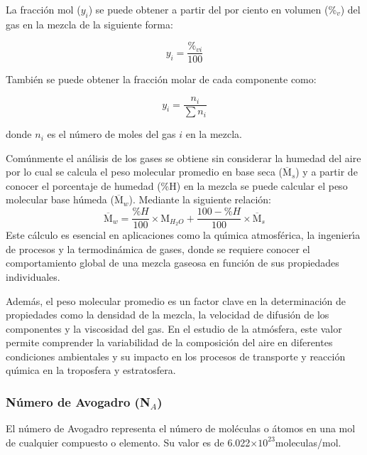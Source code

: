 La fracci\'on mol ($y_i$) se puede obtener a partir del por ciento en volumen (\%$_v$) del gas en la mezcla de la siguiente forma:

\begin{equation}
y_i = \frac{\%_{vi} }{100} 
\label{fraccion}
\end{equation}

Tambi\'en se puede obtener la fracci\'on molar de cada componente  como:

\begin{equation}
y_i = \frac{n_i}{\sum n_i}
\end{equation}

donde $n_i$ es el n\'umero de moles del gas $i$ en la mezcla.

Com\'unmente el an\'alisis de los gases se obtiene sin considerar la humedad del aire por lo cual se calcula el peso molecular promedio en base seca ($\overline{\textrm{M}}_s$) y a partir de conocer el porcentaje de humedad (\%H) en la mezcla se puede calcular el peso molecular base h\'umeda ($\overline{\textrm{M}}_w$). Mediante la siguiente relaci\'on:
\begin{equation}
\overline{\textrm{M}}_w= \frac{\%H}{100}\times \textrm{M}_{H_2O} +
\frac{100-\%H}{100} \times \overline{\textrm{M}}_s
\label{hum}
\end{equation}
Este c\'alculo es esencial en aplicaciones como la qu\'{\i}mica atmosf\'erica, la ingenier\'{\i}a de procesos y la termodin\'amica de gases, donde se requiere conocer el comportamiento global de una mezcla gaseosa en funci\'on de sus propiedades individuales. 

Adem\'as, el peso molecular promedio es un factor clave en la determinaci\'on de propiedades como la densidad de la mezcla, la velocidad de difusi\'on de los componentes y la viscosidad del gas. En el estudio de la atm\'osfera, este valor permite comprender la variabilidad de la composici\'on del aire en diferentes condiciones ambientales y su impacto en los procesos de transporte y reacci\'on qu\'{\i}mica en la troposfera y estratosfera.

\subsubsection{N\'umero de Avogadro (N$_A$)}
 
 El n\'umero de Avogadro representa el n\'umero de mol\'e\-culas o \'atomos en una mol de cualquier compuesto o elemento. Su valor es de 6.022$\times10^{23}$moleculas/mol.
 
